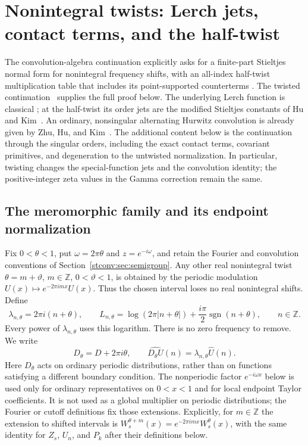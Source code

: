 \section{Nonintegral twists: Lerch jets, contact terms, and the half-twist}
\label{tw:sec:main}

The convolution-algebra continuation explicitly asks for a
finite-part Stieltjes normal form for nonintegral frequency shifts, with
an all-index half-twist multiplication table that includes its
point-supported counterterms
\cite[``Twists, characters, and alternate endpoint normalizations'']{stconv:algebra-report}.
The twisted continuation~\cite{tw:report} supplies the full proof below. The underlying Lerch
function is classical \cite[\S25.14]{tw:DLMFLerch}; at the half-twist its
order jets are the modified Stieltjes constants of Hu and
Kim~\cite{tw:HuKim}. An ordinary, nonsingular alternating Hurwitz
convolution is already given by Zhu, Hu, and
Kim~\cite[Theorem~1.13]{tw:ZhuHuKim}. The additional content below is
the continuation through the singular orders, including the exact
contact terms, covariant primitives, and degeneration to the untwisted
normalization. In particular, twisting changes the special-function
jets and the convolution identity; the positive-integer zeta values in
the Gamma correction remain the same.

\subsection{The meromorphic family and its endpoint normalization}

Fix $0<\theta<1$, put $\omega=2\pi\theta$ and $z=e^{-i\omega}$, and
retain the Fourier and convolution conventions of
Section~\ref{stconv:sec:semigroup}. Any other real nonintegral twist
$\theta=m+\vartheta$, $m\in\mathbb Z$, $0<\vartheta<1$, is obtained
by the periodic modulation $U(x)\mapsto e^{-2\pi imx}U(x)$.
Thus the chosen interval loses no real nonintegral shifts. Define
\begin{equation}\label{tw:eq:lambda}
 \lambda_{n,\theta}=2\pi i(n+\theta),\qquad
 L_{n,\theta}=\log(2\pi|n+\theta|)
                      +\frac{i\pi}{2}\operatorname{sgn}(n+\theta),
 \qquad n\in\mathbb Z.
\end{equation}
Every power of $\lambda_{n,\theta}$ uses this logarithm. There is no
zero frequency to remove. We write
\[
 D_\theta=D+2\pi i\theta,
 \qquad \widehat{D_\theta U}(n)=\lambda_{n,\theta}\widehat U(n).
\]
Here $D_\theta$ acts on ordinary periodic distributions, rather than on
functions satisfying a different boundary condition.
The nonperiodic factor $e^{-i\omega x}$ below is used only for
ordinary representatives on $0<x<1$ and for local endpoint Taylor
coefficients. It is not used as a global multiplier on periodic
distributions; the Fourier or cutoff definitions fix those extensions.
Explicitly, for $m\in\mathbb Z$ the extension to shifted intervals is
$W_s^{\theta+m}(x)=e^{-2\pi imx}W_s^\theta(x)$, with the same identity
for $Z_s$, $U_n$, and $P_k$ after their definitions below.


